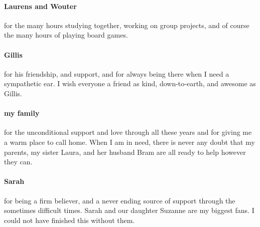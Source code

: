 \paragraph{Laurens and Wouter}
for the many hours studying together, working on group projects, and of course the many hours of playing board games.

\paragraph{Gillis}
for his friendship, and support, and for always being there when I need a sympathetic ear.
I wish everyone a friend as kind, down-to-earth, and awesome as Gillis.

\paragraph{my family}
for the unconditional support and love through all these years and for giving me a warm place to call home.
When I am in need, there is never any doubt that my parents, my sister Laura, and her husband Bram are all ready to help however they can.

\paragraph{Sarah}
for being a firm believer, and a never ending source of support through the sometimes difficult times.
Sarah and our daughter Suzanne are my biggest fans.
I could not have finished this without them.